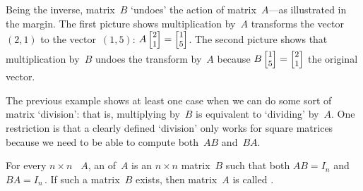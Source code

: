 \begin{example}
\begin{solution}
Being the inverse, matrix~\(B\) `undoes' the action of matrix~\(A\)---as illustrated in the margin.
The first picture shows multiplication by~\(A\) transforms the vector~\((2,1)\) to the vector~\((1,5)\): \(A\footnotesize\begin{bmatrix} 2\\1 \end{bmatrix}=\begin{bmatrix} 1\\5 \end{bmatrix}\).
The second picture shows that multiplication by~\(B\) undoes the transform by~\(A\) because \(B\footnotesize\begin{bmatrix} 1\\5 \end{bmatrix}=\begin{bmatrix} 2\\1 \end{bmatrix}\) the original vector.
%
\end{solution}
\end{example}

The previous example shows at least one case when we can do some sort of matrix `division': that is, multiplying by~\(B\) is equivalent to `dividing' by~\(A\).
One restriction is that a clearly defined `division' only works for square matrices because we need to be able to compute both~\(AB\) and~\(BA\).


\begin{definition}[inverse] \label{def:invertible} 
For every \(n\times n\) ~\(A\), an  of~\(A\) is an \(n\times n\) matrix~\(B\) such that both \(AB=I_n\) and \(BA=I_n\)\,.
If such a matrix~\(B\) exists, then matrix~\(A\) is called .
\end{definition}


